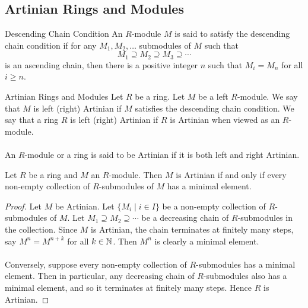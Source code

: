 \documentclass[a4paper]{article}
\begin{document}
\subsection{Artinian Rings and Modules}
\begin{defn}{Descending Chain Condition}{} An $R$-module $M$ is said to satisfy the descending chain condition if for any $M_1,M_2,\dots$ submodules of $M$ such that $$M_1\supseteq M_2\supseteq M_3\supseteq\cdots$$ is an ascending chain, then there is a positive integer $n$ such that $M_i=M_n$ for all $i\geq n$. 
\end{defn}

\begin{defn}{Artinian Rings and Modules}{} Let $R$ be a ring. Let $M$ be a left $R$-module. We say that $M$ is left (right) Artinian if $M$ satisfies the descending chain condition. We say that a ring $R$ is left (right) Artinian if $R$ is Artinian when viewed as an $R$-module. \\~\\

An $R$-module or a ring is said to be Artinian if it is both left and right Artinian. 
\end{defn}

\begin{prp}{}{} Let $R$ be a ring and $M$ an $R$-module. Then $M$ is Artinian if and only if every non-empty collection of $R$-submodules of $M$ has a minimal element. 
\begin{proof}
Let $M$ be Artinian. Let $\{M_i\;|\;i\in I\}$ be a non-empty collection of $R$-submodules of $M$. Let $M_1\supseteq M_2\supseteq\cdots$ be a decreasing chain of $R$-submodules in the collection. Since $M$ is Artinian, the chain terminates at finitely many steps, say $M^n=M^{n+k}$ for all $k\in\mathbb{N}$. Then $M^n$ is clearly a minimal element. \\~\\

Conversely, suppose every non-empty collection of $R$-submodules has a minimal element. Then in particular, any decreasing chain of $R$-submodules also has a minimal element, and so it terminates at finitely many steps. Hence $R$ is Artinian. 
\end{proof}
\end{prp}
\end{document}

